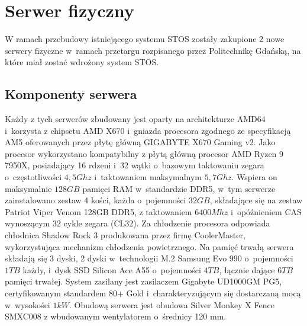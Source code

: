 \section{Serwer fizyczny}
W ramach przebudowy istniejącego systemu STOS zostały zakupione 2 nowe serwery fizyczne w~ramach przetargu rozpisanego przez Politechnikę Gdańską, na które miał zostać wdrożony system STOS.

\subsection{Komponenty serwera}
Każdy z tych serwerów zbudowany jest oparty na architekturze AMD64 i~korzysta z chipsetu AMD X670 i~gniazda procesora zgodnego ze specyfikacją AM5 oferowanych przez płytę główną GIGABYTE X670 Gaming v2\cite{gigabyteX670}. Jako procesor wykorzystano kompatybilny z płytą główną procesor AMD Ryzen 9 7950X, posiadający 16 rdzeni i~32 wątki o~bazowym taktowaniu zegara o~częstotliwości $4,5 Ghz$ i~taktowaniem maksymalnym $5,7 Ghz$\cite{ryzen}. Wspiera on maksymalnie $128 GB$ pamięci RAM w~standardzie DDR5, w~tym serwerze zainstalowano zestaw 4 kości, każda o~pojemności $32 GB$, składające się na zestaw Patriot Viper Venom 128GB DDR5, z taktowaniem $6400 Mhz$ i~opóźnieniem CAS wynoszącym 32 cykle zegara (CL32)\cite{patriotRam}. Za chłodzenie procesora odpowiada chłodnica Shadow Rock 3 produkowana przez firmę CoolerMaster, wykorzystująca mechanizm chłodzenia powietrznego\cite{coolermaster}. Na pamięć trwałą serwera składają się 3 dyski, 2 dyski w~technologii M.2 Samsung Evo 990 o~pojemności $1 TB$ każdy\cite{samsungSsd}, i~dysk SSD Silicon Ace A55\cite{sataSsd} o~pojemności $4 TB$, łącznie dające $6 TB$ pamięci trwałej. System zasilany jest zasilaczem Gigabyte UD1000GM PG5, certyfikowanym standardem 80+ Gold i~charakteryzującym się dostarczaną mocą w~wysokości $1 kW$\cite{zasilka}.  Obudową serwera jest obudowa Silver Monkey X Fence SMXC008 z wbudowanym wentylatorem o~średnicy 120 mm\cite{obudowa}.

